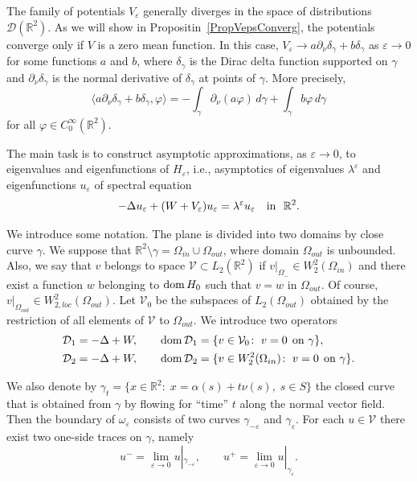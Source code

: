 \documentclass[reqno]{amsart}
\theoremstyle{plain}
\numberwithin{equation}{section}
\newcommand{\dom}{\mathop{\rm dom}}
\newcommand{\Real}{\mathbb R}
\newcommand{\eps}{\varepsilon}
\renewcommand{\phi}{\varphi}
\newcommand{\npt}{\partial_\nu}
\begin{document}
The family of potentials $V_\eps$ generally diverges in the space of distributions $\mathcal{D}(\Real^2)$.
As we will show  in Propositin~\ref{PropVepsConverg},
the  potentials converge only if $V$ is a zero mean function. In this case,
$V_\eps\to a \partial_\nu\delta_\gamma+b\delta_\gamma$ as $\eps\to 0$ for some functions $a$ and $b$,
where $\delta_\gamma$ is the Dirac delta function supported on $\gamma$ and $\partial_\nu\delta_\gamma$ is the normal derivative of $\delta_\gamma$ at points of $\gamma$. More precisely,
\begin{equation*}
  \langle a\partial_\nu\delta_\gamma+b \delta_\gamma, \phi \rangle= -\int_\gamma  \npt(a\phi)\,d\gamma+\int_\gamma b \phi\,d\gamma
\end{equation*}
for all $\phi\in C^\infty_0(\Real^2)$.

The main task is to construct asymptotic approximations, as $\eps\to 0$, to eigenvalues  and eigenfunctions of $H_\eps$, i.e., asymptotics of eigenvalues $\lambda^\eps$ and eigenfunctions $u_\eps$ of spectral equation
\begin{equation}\label{SpectralEqn}
-\Delta u_\eps +(W+V_\eps) u_\eps= \lambda^\eps u_\eps\quad \hbox{in \ } \Real^2.
\end{equation}





We  introduce some notation. The plane is divided into two domains by close curve $\gamma$.  We suppose that $\Real^2\setminus\gamma=\Omega_{in}\cup\Omega_{out}$, where domain $\Omega_{out}$ is unbounded. Also, we say that $v$ belongs to space $\mathcal{V}\subset L_2(\Real^2)$ if $v|_{\Omega_-}\in W_2^2(\Omega_{in})$ and there exist a function $w$ belonging to $\dom H_0$ such that $v=w$ in $\Omega_{out}$. Of course, $v|_{\Omega_{out}}\in W_{2,loc}^2(\Omega_{out})$.
Let $\mathcal{V}_0$ be the subspaces of $L_2(\Omega_{out})$
obtained by the restriction of all elements of $\mathcal{V}$ to $\Omega_{out}$.   We introduce two operators
\begin{align*}
&\mathcal{D}_1= -\Delta+W, \qquad \dom \mathcal{D}_1=\{v\in \mathcal{V}_0\colon\; v=0 \;\,\mbox{on } \gamma\},\\
&\mathcal{D}_2= -\Delta+W, \qquad \dom \mathcal{D}_2=\{v\in W_2^2(\Omega_{in})\colon\; v=0 \;\,\mbox{on } \gamma\}.
\end{align*}


We also denote by $\gamma_t=\{x\in\Real^2\colon\; x=\alpha(s)+t\nu(s), \; s\in S\}$ the closed curve that is obtained from $\gamma$ by flowing for ``time'' $t$ along the normal vector field. Then the boundary of $\omega_\eps$ consists of two curves $\gamma_{-\eps}$ and $\gamma_{\eps}$. For each $u\in \mathcal{V}$ there exist two one-side traces on $\gamma$, namely
\begin{equation}\label{UpmNotation}
  u^-=\lim_{\eps\to 0}u|_{\gamma_{-\eps}}, \qquad
u^+=\lim_{\eps\to 0}u|_{\gamma_{\eps}}.
\end{equation}
\end{document}
